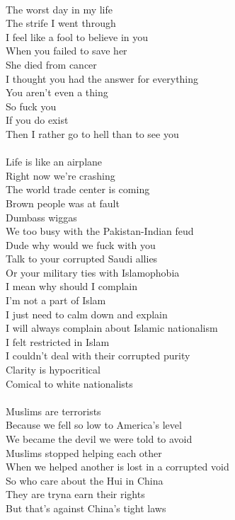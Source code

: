 \documentclass[12pt, b5paper, oneside]{book}
\begin{document}
\\The worst day in my life
\\The strife I went through
\\I feel like a fool to believe in you
\\When you failed to save her
\\She died from cancer
\\I thought you had the answer for everything
\\You aren't even a thing
\\So fuck you
\\If you do exist
\\Then I rather go to hell than to see you
%
\\\\Life is like an airplane
\\Right now we're crashing
\\The world trade center is coming
\\Brown people was at fault
\\Dumbass wiggas
\\We too busy with the Pakistan-Indian feud
\\Dude why would we fuck with you
\\Talk to your corrupted Saudi allies
\\Or your military ties with Islamophobia
\\I mean why should I complain
\\I'm not a part of Islam
\\I just need to calm down and explain
\\I will always complain about Islamic nationalism
\\I felt restricted in Islam
\\I couldn't deal with their corrupted purity
\\Clarity is hypocritical
\\Comical to white nationalists
%
\\\\Muslims are terrorists
\\Because we fell so low to America's level
\\We became the devil we were told to avoid
\\Muslims stopped helping each other
\\When we helped another is lost in a corrupted void
\\So who care about the Hui in China
\\They are tryna earn their rights
\\But that's against China's tight laws
\end{document}

